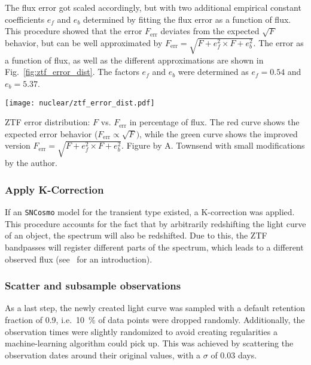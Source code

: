 The flux error got scaled accordingly, but with two additional empirical constant coefficients $e_f$ and $e_b$ determined by fitting the flux error as a function of flux. This procedure showed that the error $F_\text{err}$ deviates from the expected $\sqrt{F}$ behavior, but can be well approximated by $F_\text{err} = \sqrt{F + e_f^2\times F + e_b^2}$. The error as a function of flux, as well as the different approximations are shown in Fig.~\ref{fig:ztf_error_dist}. The factors $e_f$ and $e_b$ were determined as $e_f = 0.54$ and $e_b = 5.37$.

\begin{marginfigure}
  \texttt{[image: nuclear/ztf\_error\_dist.pdf]}
  \caption[ZTF error distribution]{ZTF error distribution: $F$ vs. $F_\text{err}$ in percentage of flux. The red curve shows the expected error behavior ($F_\text{err}\propto \sqrt{F})$, while the green curve shows the improved version $F_\text{err} = \sqrt{F + e_f^2\times F + e_b^2}$. Figure by A. Townsend with small modifications by the author.}
\end{marginfigure}

\subsubsection{Apply K-Correction}
If an \texttt{SNCosmo} model for the transient type existed, a K-correction was applied. This procedure accounts for the fact that by arbitrarily redshifting the light curve of an object, the spectrum will also be redshifted. Due to this, the ZTF bandpasses will register different parts of the spectrum, which leads to a different observed flux (see~ for an introduction).

\subsubsection{Scatter and subsample observations}
As a last step, the newly created light curve was sampled with a default retention fraction of 0.9, i.e.~\SI{10}{\percent} of data points were dropped randomly. Additionally, the observation times were slightly randomized to avoid creating regularities a machine-learning algorithm could pick up. This was achieved by scattering the observation dates around their original values, with a $\sigma$ of $0.03$ days.

